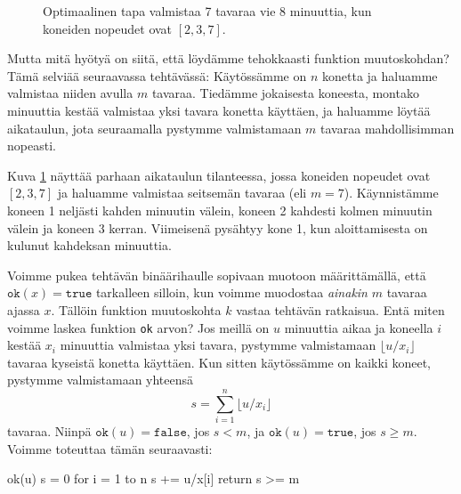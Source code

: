 \begin{figure}
\center
{}
\caption{Optimaalinen tapa valmistaa 7 tavaraa vie 8 minuuttia,
kun koneiden nopeudet ovat $[2,3,7]$.}
\label{fig:optkon}
\end{figure}

Mutta mitä hyötyä on siitä, että löydämme tehokkaasti funktion muutoskohdan?
Tämä selviää seuraavassa tehtävässä:
Käytössämme on $n$ konetta
ja haluamme valmistaa niiden avulla $m$ tavaraa.
Tiedämme jokaisesta koneesta,
montako minuuttia kestää valmistaa yksi tavara konetta käyttäen,
ja haluamme löytää aikataulun, jota seuraamalla pystymme valmistamaan
$m$ tavaraa mahdollisimman nopeasti.

Kuva \ref{fig:optkon} näyttää parhaan aikataulun tilanteessa,
jossa koneiden nopeudet ovat $[2,3,7]$ ja haluamme
valmistaa seitsemän tavaraa (eli $m=7$).
Käynnistämme koneen 1 neljästi kahden minuutin välein,
koneen 2 kahdesti kolmen minuutin välein ja koneen 3 kerran.
Viimeisenä pysähtyy kone 1, kun aloittamisesta
on kulunut kahdeksan minuuttia.

Voimme pukea tehtävän binäärihaulle sopivaan muotoon määrittämällä,
että $\texttt{ok}(x)=\texttt{true}$ tarkalleen silloin, kun voimme muodostaa
\emph{ainakin} $m$ tavaraa ajassa $x$.
Tällöin funktion muutoskohta $k$ vastaa tehtävän ratkaisua.
Entä miten voimme laskea funktion \texttt{ok} arvon?
Jos meillä on $u$ minuuttia aikaa ja koneella $i$ kestää $x_i$
minuuttia valmistaa yksi tavara, pystymme valmistamaan
$\lfloor u/x_i \rfloor$ tavaraa kyseistä konetta käyttäen.
Kun sitten käytössämme on kaikki koneet,
pystymme valmistamaan yhteensä
\[ s = \sum_{i=1}^n \lfloor u/x_i \rfloor \]
tavaraa. Niinpä $\texttt{ok}(u)=\texttt{false}$, jos $s<m$,
ja $\texttt{ok}(u)=\texttt{true}$, jos $s \ge m$. Voimme toteuttaa tämän seuraavasti:

\begin{code}
ok(u)
    s = 0
    for i = 1 to n
        s += u/x[i]
    return s >= m
\end{code}

